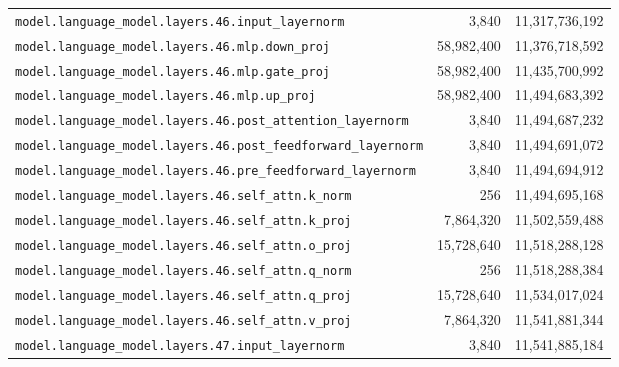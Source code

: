 \documentclass[10pt,a4paper]{article}
\theoremstyle{definition}
\begin{document}
\begin{appendices}
\begin{longtable}{p{9.5cm}rr}
\texttt{model.\allowbreak{}language\_model.\allowbreak{}layers.\allowbreak{}46.\allowbreak{}input\_layernorm} & 3,840 & 11,317,736,192 \\
\texttt{model.\allowbreak{}language\_model.\allowbreak{}layers.\allowbreak{}46.\allowbreak{}mlp.\allowbreak{}down\_proj} & 58,982,400 & 11,376,718,592 \\
\texttt{model.\allowbreak{}language\_model.\allowbreak{}layers.\allowbreak{}46.\allowbreak{}mlp.\allowbreak{}gate\_proj} & 58,982,400 & 11,435,700,992 \\
\texttt{model.\allowbreak{}language\_model.\allowbreak{}layers.\allowbreak{}46.\allowbreak{}mlp.\allowbreak{}up\_proj} & 58,982,400 & 11,494,683,392 \\
\texttt{model.\allowbreak{}language\_model.\allowbreak{}layers.\allowbreak{}46.\allowbreak{}post\_attention\_layernorm} & 3,840 & 11,494,687,232 \\
\texttt{model.\allowbreak{}language\_model.\allowbreak{}layers.\allowbreak{}46.\allowbreak{}post\_feedforward\_layernorm} & 3,840 & 11,494,691,072 \\
\texttt{model.\allowbreak{}language\_model.\allowbreak{}layers.\allowbreak{}46.\allowbreak{}pre\_feedforward\_layernorm} & 3,840 & 11,494,694,912 \\
\texttt{model.\allowbreak{}language\_model.\allowbreak{}layers.\allowbreak{}46.\allowbreak{}self\_attn.\allowbreak{}k\_norm} & 256 & 11,494,695,168 \\
\texttt{model.\allowbreak{}language\_model.\allowbreak{}layers.\allowbreak{}46.\allowbreak{}self\_attn.\allowbreak{}k\_proj} & 7,864,320 & 11,502,559,488 \\
\texttt{model.\allowbreak{}language\_model.\allowbreak{}layers.\allowbreak{}46.\allowbreak{}self\_attn.\allowbreak{}o\_proj} & 15,728,640 & 11,518,288,128 \\
\texttt{model.\allowbreak{}language\_model.\allowbreak{}layers.\allowbreak{}46.\allowbreak{}self\_attn.\allowbreak{}q\_norm} & 256 & 11,518,288,384 \\
\texttt{model.\allowbreak{}language\_model.\allowbreak{}layers.\allowbreak{}46.\allowbreak{}self\_attn.\allowbreak{}q\_proj} & 15,728,640 & 11,534,017,024 \\
\texttt{model.\allowbreak{}language\_model.\allowbreak{}layers.\allowbreak{}46.\allowbreak{}self\_attn.\allowbreak{}v\_proj} & 7,864,320 & 11,541,881,344 \\
\texttt{model.\allowbreak{}language\_model.\allowbreak{}layers.\allowbreak{}47.\allowbreak{}input\_layernorm} & 3,840 & 11,541,885,184 \\

\end{longtable}
\end{appendices}
\end{document}
